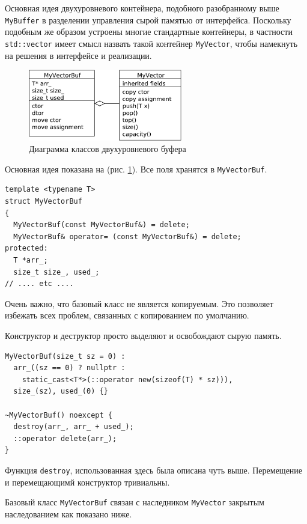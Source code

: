 \documentclass[a4paper,12pt,oneside]{article}
\begin{document}
Основная идея двухуровневого контейнера, подобного разобранному выше \lstinline!MyBuffer! в разделении управления сырой памятью от интерфейса. Поскольку подобным же образом устроены многие стандартные контейнеры, в частности \lstinline!std::vector! имеет смысл назвать такой контейнер \lstinline!MyVector!, чтобы намекнуть на решения в интерфейсе и реализации.

\begin{figure}[ht]
\centering
\includegraphics[width=0.6\textwidth]{illustrations/myvector-crop.pdf}
\caption{Диаграмма классов двухуровневого буфера}
\label{fig:my_vector}
\end{figure}

Основная идея показана на (рис. \ref{fig:my_vector}). Все поля хранятся в \lstinline!MyVectorBuf!.

\begin{lstlisting}
template <typename T>
struct MyVectorBuf 
{
  MyVectorBuf(const MyVectorBuf&) = delete;
  MyVectorBuf& operator= (const MyVectorBuf&) = delete;
protected:
  T *arr_;
  size_t size_, used_;
// .... etc ....
\end{lstlisting}

Очень важно, что базовый класс не является копируемым. Это позволяет избежать всех проблем, связанных с копированием по умолчанию.

Конструктор и деструктор просто выделяют и освобождают сырую память.

\begin{lstlisting}
MyVectorBuf(size_t sz = 0) : 
  arr_((sz == 0) ? nullptr : 
    static_cast<T*>(::operator new(sizeof(T) * sz))), 
  size_(sz), used_(0) {}

~MyVectorBuf() noexcept {
  destroy(arr_, arr_ + used_);
  ::operator delete(arr_);
}
\end{lstlisting}

Функция \lstinline!destroy!, использованная здесь была описана чуть выше. Перемещение и перемещающимй конструктор тривиальны.

Базовый класс \lstinline!MyVectorBuf! связан с наследником \lstinline!MyVector! закрытым наследованием как показано ниже.
\end{document}
